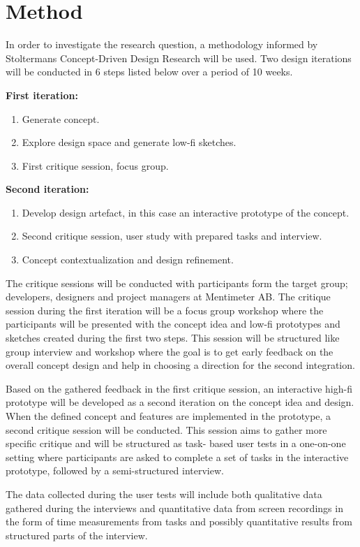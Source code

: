 

\section{Method}
In order to investigate the research question, a methodology informed by Stoltermans Concept-Driven Design Research will be used. \cite{stolterman_concept-driven_2010}
Two design iterations will be conducted in 6 steps listed below over a period of 10 weeks.

\smallskip
\textbf{First iteration:}
\begin{enumerate}
  \item Generate concept.
  \item Explore design space and generate low-fi sketches.
  \item First critique session, focus group.
\end{enumerate}

\smallskip
\textbf{Second iteration:}
\begin{enumerate}
  \item Develop design artefact, in this case an interactive prototype of the concept.
  \item Second critique session, user study with prepared tasks and interview.
  \item Concept contextualization and design refinement.
\end{enumerate}
\smallskip
The critique sessions will be conducted with participants form the target group; developers, designers and project managers at Mentimeter AB. 
The critique session during the first iteration will be a focus group workshop where the participants will be presented with the concept idea and low-fi prototypes and sketches created during the first two steps. 
This session will be structured like group interview and workshop where the goal is to get early feedback on the overall concept design and help in choosing a direction for the second integration.

Based on the gathered feedback in the first critique session, an interactive high-fi prototype will be developed as a second iteration on the concept idea and design. 
When the defined concept and features are implemented in the prototype, a second critique session will be conducted. 
This session aims to gather more specific critique and will be structured as task- based user tests in a one-on-one setting where participants are asked to complete a set of tasks in the interactive prototype, followed by a semi-structured interview.

The data collected during the user tests will include both qualitative data gathered during the interviews and quantitative data from screen recordings in the form of time measurements from tasks and possibly quantitative results from structured parts of the interview.